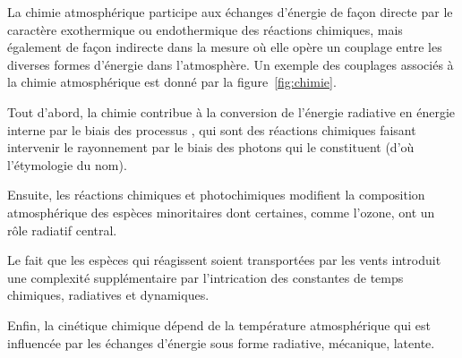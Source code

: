 \sk
La chimie atmosphérique participe aux échanges d'énergie de façon directe par le caractère exothermique ou endothermique des réactions chimiques, mais également de façon indirecte dans la mesure où elle opère un couplage entre les diverses formes d'énergie dans l'atmosphère. Un exemple des couplages associés à la chimie atmosphérique est donné par la figure~\ref{fig:chimie}.
\begin{citemize}
\item Tout d'abord, la chimie contribue à la conversion de l'énergie radiative en énergie interne par le biais des processus , qui sont des réactions chimiques faisant intervenir le rayonnement par le biais des photons qui le constituent (d'où l'étymologie du nom). 
\item Ensuite, les réactions chimiques et photochimiques modifient la composition atmosphérique des espèces minoritaires dont certaines, comme l'ozone, ont un rôle radiatif central. 
\item Le fait que les espèces qui réagissent soient transportées par les vents introduit une complexité supplémentaire par l'intrication des constantes de temps chimiques, radiatives et dynamiques. 
\item Enfin, la cinétique chimique dépend de la température atmosphérique qui est influencée par les échanges d'énergie sous forme radiative, mécanique, latente. 
\end{citemize}


